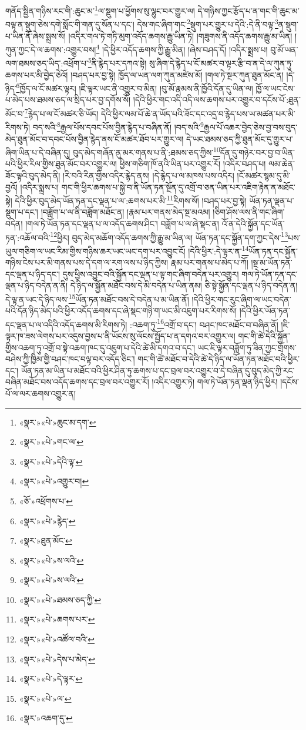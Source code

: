 གནོད་སྦྱིན་གཉིས་རང་གི་:ཆུང་མ་\footnote{«སྣར་»«པེ་»ཆུང་མ་དག་}ལ་སྡུག་པ་ཕྱོགས་སུ་ལྷུང་བར་གྱུར་ལ། དེ་གཉིས་ཀྱང་རྩོད་པ་ན་གང་གི་ཆུང་མ་བལྟ་ན་སྡུག་ཅེས་དགེ་སློང་གི་གན་དུ་སོན་པ་དང་། དེས་གང་ཞིག་གང་\footnote{«སྣར་»«པེ་»གང་ལ་}སྡུག་པར་གྱུར་པ་དེའི་:དེ་ནི་བལྟ་\footnote{«སྣར་»«པེ་»དེའི་ལྟ་}ན་སྡུག་པ་ཡིན་ནོ་ཞེས་སྨྲས་སོ། །འདིར་གལ་ཏེ་གཏི་མུག་འདོད་ཆགས་རྒྱུ་ཡིན་ཏེ། །གཟུགས་ནི་འདོད་ཆགས་རྒྱུ་མ་ཡིན། །ཀུན་ཀྱང་དེ་ལ་ཆགས་:འགྱུར་བས།\footnote{«སྣར་»«པེ་»འགྱུར་བ།} །དེ་ཕྱིར་འདོད་ཆགས་ཀྱི་རྒྱུ་མིན། །ཞེས་བཤད་དོ། །འདིར་སྨྲས་པ། བུ་མོ་ཡན་ལག་ཐམས་ཅད་ཡིད་:འཕྲོག་པ་\footnote{«ཅོ་»འཕྲོགས་པ་}ནི་རྙེད་པར་དཀའ་སྟེ། སུ་ཞིག་དེ་རྙེད་པ་ངོ་མཚར་བ་ལྟར་རྩི་བ་ན་དེ་ལ་ཀུན་ཏུ་ཆགས་པར་མི་བྱེད་ཅེའོ། །བཤད་པར་བྱ་སྟེ། ཁྱོད་ལ་ཡན་ལག་ཀུན་མཛེས་མོ། །གལ་ཏེ་སྔར་ཀུན་ཐུན་མོང་ན། །དེ་ཉིད་\footnote{«སྣར་»«པེ་»རྙེད་}ཁྱོད་ལ་ངོ་མཚར་ལྟར། །ཇི་ལྟར་ཡང་ནི་འགྱུར་བ་མིན། །བུ་མོ་རྣམས་ནི་ཁྱོའི་དོན་དུ་ཡིན་ལ། ཁྱོ་ལ་ཡང་ངེས་པ་མེད་པས་ཐམས་ཅད་ལ་སྲིད་པར་བྱ་དགོས་སོ། །དེའི་ཕྱིར་གང་འདི་འདི་ལས་ཆགས་པར་འགྱུར་བ་དངོས་པོ་:ཐུན་མོང་བ་\footnote{«སྣར་»ཐུན་མོང་}རྙེད་པ་ལ་ངོ་མཚར་ཅི་ཡོད། དེའི་ཕྱིར་ལམ་པོ་ཆེ་ན་ཡོད་པའི་ཟོང་དང་འདྲ་བ་རྙེད་པས་ཡ་མཚན་པར་མི་རིགས་ཏེ། བད་སའི་\footnote{«སྣར་»«པེ་»ས་ལའི་}རྒྱལ་པོས་དབང་པོས་བྱིན་རྙེད་པ་བཞིན་ནོ། །བད་སའི་\footnote{«སྣར་»«པེ་»ས་ལའི་}རྒྱལ་པོ་འཆར་བྱེད་ཅེས་བྱ་བས་བུད་མེད་ཐུན་མོང་བ་དབང་པོས་བྱིན་རྙེད་ནས་ངོ་མཚར་ཐོབ་པར་གྱུར་ལ། དེ་ཡང་ཐམས་ཅད་ཀྱི་ཐུན་མོང་དུ་གྱུར་པ་ཞིག་ཡིན་པ་དེ་བཞིན་དུ། བུད་མེད་གཞོན་ནུ་མར་གནས་པ་ནི་:ཐམས་ཅད་ཀྱིས་\footnote{«སྣར་»«པེ་»ཐམས་ཅད་ཀྱི་}དོན་དུ་གཉེར་བར་བྱ་བ་ཡིན་པའི་ཕྱིར་རིལ་གྱིས་ཐུན་མོང་བར་འགྱུར་ལ། ཕྱིས་གཅིག་ཁོ་ནའི་ཡིན་པར་འགྱུར་རོ། །འདིར་བཤད་པ། ལམ་ཆེན་ཟོང་ལྟའི་བུད་མེད་ནི། །རི་བའི་རིན་གྱིས་འདིར་རྙེད་ནས། །དེ་རྙེད་པ་ལ་མཁས་པས་འདིར། །ངོ་མཚར་སྙམ་དུ་མི་བྱའོ། །འདིར་སྨྲས་པ། གང་གི་ཕྱིར་ཆགས་པ་སྐྱེ་བ་ནི་ཡོན་ཏན་སྔོན་དུ་འགྲོ་བ་ཅན་ཡིན་པར་འཇིག་རྟེན་ན་མཐོང་སྟེ། དེའི་ཕྱིར་བུད་མེད་ཡོན་ཏན་དང་ལྡན་པ་ལ་:ཆགས་པར་མི་\footnote{«སྣར་»«པེ་»ཆགས་པར་}རིགས་སོ། །བཤད་པར་བྱ་སྟེ། ཡོན་ཏན་ལྡན་པ་སྡུག་པ་དང་། །བཟློག་པ་ལ་ནི་བཟློག་མཐོང་ན། །རྣམ་པར་གནས་མེད་སྔ་མའམ། །ཅིག་ཤོས་ལས་ནི་གང་ཞིག་བདེན། །གལ་ཏེ་ཡོན་ཏན་དང་ལྡན་པ་ལ་འདོད་ཆགས་ཤིང་། བཟློག་པ་ལ་ཞེ་སྡང་ན། འོ་ན་དེའི་སྐྱོན་དང་ཡོན་ཏན་:འཆོལ་བའི་\footnote{«སྣར་»«པེ་»འཚོལ་བའི་}ཕྱིར། བུད་མེད་མཆོག་འདོད་ཆགས་ཀྱི་རྒྱུ་མ་ཡིན་ལ། ཡོན་ཏན་དང་སྐྱོན་དག་ཀྱང་དེས་\footnote{«སྣར་»«པེ་»དེས་པ་མེད་}པས་ཡུལ་གཅིག་ལ་ཡང་རིམ་གྱིས་གཉིས་ཆར་ཡང་ཡང་དག་པར་འབྱུང་ངོ། །དེའི་ཕྱིར་:དེ་ལྟར་ན་\footnote{«སྣར་»«པེ་»དེ་ལྟར་}ཡོན་ཏན་དང་སྐྱོན་གཉིས་ངེས་པར་མི་གནས་པས་དེ་དག་ལ་རག་ལས་པ་ཉིད་ཀྱིས། རྣམ་པར་གནས་པ་མེད་པ་ཀོ། །སྔ་མ་ཡོན་ཏན་དང་ལྡན་པ་ཉིད་དང་། དུས་ཕྱིས་འབྱུང་བའི་སྐྱོན་དང་ལྡན་པ་ལྟ་གང་ཞིག་བདེན་པར་འགྱུར། གལ་ཏེ་ཡོན་ཏན་དང་ལྡན་པ་ཉིད་བདེན་ན་ནི། དེ་ཉིད་ལ་སྐྱོན་མཐོང་བས་དེ་མི་བདེན་པ་ཡིན་ནམ། ཅི་སྟེ་སྐྱོན་དང་ལྡན་པ་ཉིད་བདེན་ན། དེ་ལྟ་ན་ཡང་དེ་ཉིད་ལས་\footnote{«སྣར་»«པེ་»ལ་}ཡོན་ཏན་མཐོང་བས་དེ་བདེན་པ་མ་ཡིན་ནོ། །དེའི་ཕྱིར་གང་རུང་ཞིག་ལ་ཡང་བདེན་པའི་དོན་ཉིད་མེད་པའི་ཕྱིར་འདོད་ཆགས་དང་ཞེ་སྡང་གཉི་ག་ཡང་མི་འཇུག་པར་རིགས་སོ། །དེའི་ཕྱིར་ཡོན་ཏན་དང་ལྡན་པ་ལ་འདིའི་འདོད་ཆགས་མི་རིགས་ཏེ། :འཆག་ཏུ་\footnote{«སྣར་»འཆག་དུ་}འགྲོ་བ་དང་། བཤང་ཁང་མཐོང་བ་བཞིན་ནོ། །ཇི་ལྟར་ཁ་ཟས་ལེགས་པར་འདུས་བྱས་པ་ནི་ཡོངས་སུ་ལོངས་སྤྱོད་པ་ན་དགའ་བར་འགྱུར་ལ། གང་གི་ཚེ་དེའི་སྐྱོན་གྱིས་འཆག་ཏུ་འགྲོ་བ་སྟེ་འཆག་ཁང་དུ་འཇུག་པ་དེའི་ཚེ་མི་དགའ་བ་དང་། ཡང་ཇི་ལྟར་བཟློག་ཏུ་ཟིན་ཀྱང་གྲོགས་བཤེས་ཀྱི་ཁྱིམ་གྱི་བཤང་ཁང་བལྟ་བར་འདོད་ཅིང་། གང་གི་ཚེ་མཐོང་བ་དེའི་ཚེ་དེ་ཉིད་ལ་ཡོན་ཏན་མཐོང་བའི་ཕྱིར་དང་། ཡོན་ཏན་མ་ཡིན་པ་མཐོང་བའི་ཕྱིར་ཤིན་ཏུ་ཆགས་པ་དང་བྲལ་བར་འགྱུར་བ་དེ་བཞིན་དུ་བུད་མེད་ཀྱི་རང་བཞིན་མཐོང་བས་འདོད་ཆགས་དང་བྲལ་བར་འགྱུར་རོ། །འདིར་འགྱུར་ཏེ། གལ་ཏེ་ཡོན་ཏན་ལྡན་ཉིད་ཕྱིར། །དངོས་པོ་ལ་ལར་ཆགས་འགྱུར་ན། 